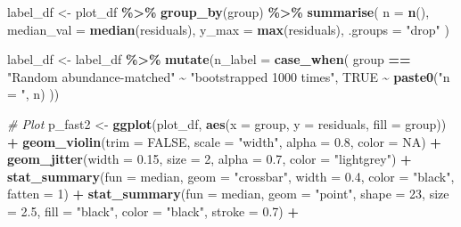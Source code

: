 \documentclass[
]{article}
\newenvironment{Shaded}{\begin{snugshade}}{\end{snugshade}}
\newcommand{\AttributeTok}[1]{\textcolor[rgb]{0.13,0.29,0.53}{#1}}
\newcommand{\CommentTok}[1]{\textcolor[rgb]{0.56,0.35,0.01}{\textit{#1}}}
\newcommand{\ConstantTok}[1]{\textcolor[rgb]{0.56,0.35,0.01}{#1}}
\newcommand{\DecValTok}[1]{\textcolor[rgb]{0.00,0.00,0.81}{#1}}
\newcommand{\FloatTok}[1]{\textcolor[rgb]{0.00,0.00,0.81}{#1}}
\newcommand{\FunctionTok}[1]{\textcolor[rgb]{0.13,0.29,0.53}{\textbf{#1}}}
\newcommand{\NormalTok}[1]{#1}
\newcommand{\OtherTok}[1]{\textcolor[rgb]{0.56,0.35,0.01}{#1}}
\newcommand{\SpecialCharTok}[1]{\textcolor[rgb]{0.81,0.36,0.00}{\textbf{#1}}}
\newcommand{\StringTok}[1]{\textcolor[rgb]{0.31,0.60,0.02}{#1}}
\begin{document}
\begin{Shaded}
\begin{Highlighting}[]
\NormalTok{label\_df }\OtherTok{\textless{}{-}}\NormalTok{ plot\_df }\SpecialCharTok{\%\textgreater{}\%}
  \FunctionTok{group\_by}\NormalTok{(group) }\SpecialCharTok{\%\textgreater{}\%}
  \FunctionTok{summarise}\NormalTok{(}
    \AttributeTok{n =} \FunctionTok{n}\NormalTok{(),}
    \AttributeTok{median\_val =} \FunctionTok{median}\NormalTok{(residuals),}
    \AttributeTok{y\_max =} \FunctionTok{max}\NormalTok{(residuals),}
    \AttributeTok{.groups =} \StringTok{"drop"}
\NormalTok{  )}

\NormalTok{label\_df }\OtherTok{\textless{}{-}}\NormalTok{ label\_df }\SpecialCharTok{\%\textgreater{}\%}
  \FunctionTok{mutate}\NormalTok{(}\AttributeTok{n\_label =} \FunctionTok{case\_when}\NormalTok{(}
\NormalTok{    group }\SpecialCharTok{==} \StringTok{"Random abundance{-}matched"} \SpecialCharTok{\textasciitilde{}} \StringTok{"bootstrapped 1000 times"}\NormalTok{,}
    \ConstantTok{TRUE} \SpecialCharTok{\textasciitilde{}} \FunctionTok{paste0}\NormalTok{(}\StringTok{"n = "}\NormalTok{, n)}
\NormalTok{  ))}

\CommentTok{\# Plot}
\NormalTok{p\_fast2 }\OtherTok{\textless{}{-}} \FunctionTok{ggplot}\NormalTok{(plot\_df, }\FunctionTok{aes}\NormalTok{(}\AttributeTok{x =}\NormalTok{ group, }\AttributeTok{y =}\NormalTok{ residuals, }\AttributeTok{fill =}\NormalTok{ group)) }\SpecialCharTok{+}
  \FunctionTok{geom\_violin}\NormalTok{(}\AttributeTok{trim =} \ConstantTok{FALSE}\NormalTok{, }\AttributeTok{scale =} \StringTok{"width"}\NormalTok{, }\AttributeTok{alpha =} \FloatTok{0.8}\NormalTok{, }\AttributeTok{color =} \ConstantTok{NA}\NormalTok{) }\SpecialCharTok{+}
  \FunctionTok{geom\_jitter}\NormalTok{(}\AttributeTok{width =} \FloatTok{0.15}\NormalTok{, }\AttributeTok{size =} \DecValTok{2}\NormalTok{, }\AttributeTok{alpha =} \FloatTok{0.7}\NormalTok{, }\AttributeTok{color =} \StringTok{"lightgrey"}\NormalTok{) }\SpecialCharTok{+}
    \FunctionTok{stat\_summary}\NormalTok{(}\AttributeTok{fun =}\NormalTok{ median, }\AttributeTok{geom =} \StringTok{"crossbar"}\NormalTok{, }\AttributeTok{width =} \FloatTok{0.4}\NormalTok{, }\AttributeTok{color =} \StringTok{"black"}\NormalTok{, }\AttributeTok{fatten =} \DecValTok{1}\NormalTok{) }\SpecialCharTok{+}
  \FunctionTok{stat\_summary}\NormalTok{(}\AttributeTok{fun =}\NormalTok{ median, }\AttributeTok{geom =} \StringTok{"point"}\NormalTok{, }\AttributeTok{shape =} \DecValTok{23}\NormalTok{, }\AttributeTok{size =} \FloatTok{2.5}\NormalTok{,}
               \AttributeTok{fill =} \StringTok{"black"}\NormalTok{, }\AttributeTok{color =} \StringTok{"black"}\NormalTok{, }\AttributeTok{stroke =} \FloatTok{0.7}\NormalTok{) }\SpecialCharTok{+}


\end{Highlighting}
\end{Shaded}
\end{document}
